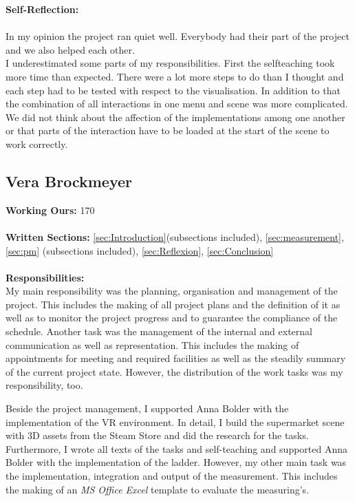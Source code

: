 \textbf{Self-Reflection:}\\ \\
In my opinion the project ran quiet well. Everybody had their part of the project and we also helped each other.\\
I underestimated some parts of my responsibilities. First the selfteaching took more time than expected. There were a lot more steps to do than I thought and each step had to be tested with respect to the visualisation. In addition to that the combination of all interactions in one menu and scene was more complicated. We did not think about the affection of the implementations among one another or that parts of the interaction have to be loaded at the start of the scene to work correctly.\\

\newpage

\newpage
\subsection{Vera Brockmeyer} \label{sec:SAVera}


\textbf{Working Ours:} 170 \\ \\
\textbf{Written Sections: }\ref{sec:Introduction}(subsections included),  \ref{sec:measurement}, \ref{sec:pm} (subsections included), \ref{sec:Reflexion}, \ref{sec:Conclusion} \\ \\
\textbf{Responsibilities:}\\ 
My main responsibility was the planning, organisation and management of the project. This includes the making of all project plans and the definition of it as well as to monitor the project progress and to guarantee the compliance of the schedule. Another task was the management of the internal and external communication as well as representation. This includes the making of appointments for meeting and required facilities as well as the steadily summary of the current project state. However, the distribution of the work tasks was my responsibility, too.

Beside the project management, I supported Anna Bolder with the implementation of the VR environment. In detail, I build the supermarket scene with 3D assets from the Steam Store and did the research for the tasks. Furthermore, I wrote all texts of the tasks and self-teaching and supported Anna Bolder with the implementation of the ladder. However, my other main task was the implementation, integration and output of the measurement. This includes the making of an \textit{MS Office Excel} template to evaluate the measuring's.


